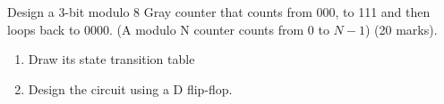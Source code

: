 \begin{prob}
  Design a 3-bit modulo 8 Gray counter that counts from 000, to 111 and then loops back
  to 0000. (A modulo N counter counts from 0 to $N-1$) (20 marks).\\
  \begin{enumerate}
  \item Draw its state transition table
  \item Design the circuit using a D flip-flop.
  \end{enumerate}
\end{prob}
